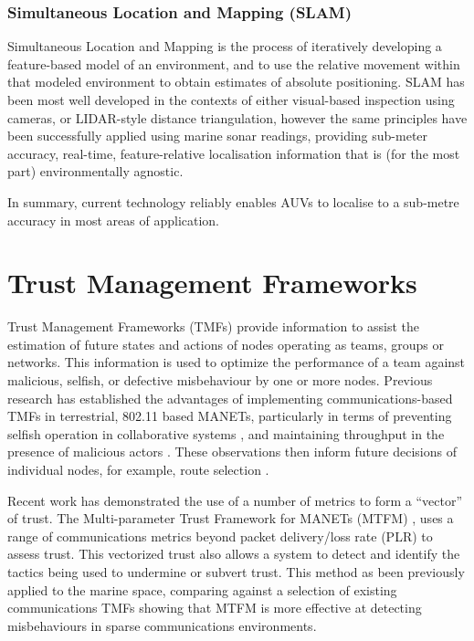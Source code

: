\subsubsection{Simultaneous Location and Mapping (SLAM)}
Simultaneous Location and Mapping is the process of iteratively developing a feature-based model of an environment, and to use the relative movement within that modeled environment to obtain estimates of absolute positioning.
SLAM has been most well developed in the contexts of either visual-based inspection using cameras, or LIDAR-style distance triangulation, however the same principles have been successfully applied using marine sonar readings, providing sub-meter accuracy, real-time, feature-relative localisation information that is (for the most part) environmentally agnostic\cite{Williams2000}.

In summary, current technology reliably enables AUVs to localise to a sub-metre accuracy in most areas of application.

\section{Trust Management Frameworks}\label{sec:tmfs}

Trust Management Frameworks (TMFs) provide information to assist the estimation of future states and actions of nodes operating as teams, groups or networks. 
This information is used to optimize the performance of a team against malicious, selfish, or defective misbehaviour by one or more nodes.
Previous research has established the advantages of implementing communications-based TMFs in terrestrial, 802.11 based MANETs, particularly in terms of preventing selfish operation in collaborative systems \cite{Li2007}, and maintaining throughput in the presence of malicious actors \cite{Buchegger2002}. 
These observations then inform future decisions of individual nodes, for example, route selection \cite{Li2008}.

Recent work has demonstrated the use of a number of metrics to form a ``vector'' of trust. The Multi-parameter Trust Framework for MANETs (MTFM) \cite{Guo2012}, uses a range of communications metrics beyond packet delivery/loss rate (PLR) to assess trust. This vectorized trust also allows a system to detect and identify the tactics being used to undermine or subvert trust. 
This method as been previously applied to the marine space, comparing against a selection of existing communications TMFs \cite{Bolster2015} showing that MTFM is more effective at detecting misbehaviours in sparse communications environments. 

